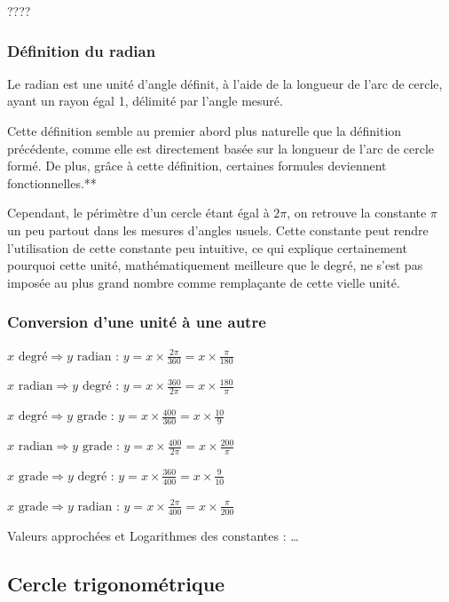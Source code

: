 \documentclass[a4paper]{article}
\begin{document}
				????

			\subsubsection{Définition du radian}

				Le radian est une unité d'angle définit, à l'aide de la longueur de l'arc de cercle, ayant un rayon égal 1, délimité par l'angle mesuré.

				Cette définition semble au premier abord plus naturelle que la définition précédente, comme elle est directement basée sur la longueur de l'arc de cercle formé. De plus, grâce à cette définition, certaines formules deviennent fonctionnelles.**

				Cependant, le périmètre d'un cercle étant égal à $2 \pi$, on retrouve la constante $\pi$ un peu partout dans les mesures d'angles usuels. Cette constante peut rendre l'utilisation de cette constante peu intuitive, ce qui explique certainement pourquoi cette unité, mathématiquement meilleure que le degré, ne s'est pas imposée au plus grand nombre comme remplaçante de cette vielle unité.

			\subsubsection{Conversion d'une unité à une autre}

				$x \text{ degré} \Rightarrow y \text{ radian : }	y = x \times \frac{2 \pi}{360} = x \times \frac{\pi}{180}$

				$x \text{ radian} \Rightarrow y \text{ degré : }	y = x \times \frac{360}{2 \pi} = x \times \frac{180}{\pi}$

				$x \text{ degré} \Rightarrow y \text{ grade : }	y = x \times \frac{400}{360} = x \times \frac{10}{9}$

				$x \text{ radian} \Rightarrow y \text{ grade : }	y = x \times \frac{400}{2 \pi} = x \times \frac{200}{\pi}$

				$x \text{ grade} \Rightarrow y \text{ degré : }	y = x \times \frac{360}{400} = x \times \frac{9}{10}$

				$x \text{ grade} \Rightarrow y \text{ radian : }	y = x \times \frac{2 \pi}{400} = x \times \frac{\pi}{200}$

				Valeurs approchées et Logarithmes des constantes : …

		\subsection{Cercle trigonométrique}
\end{document}
